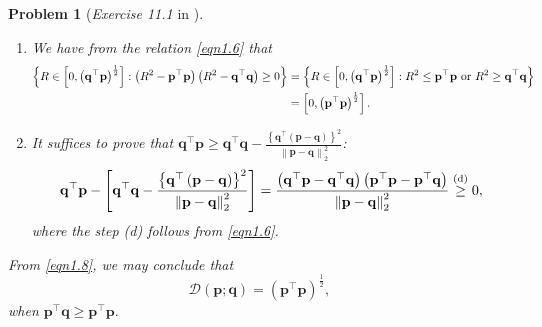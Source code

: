 \documentclass[11pt]{article}
\newtheorem{problem}{Problem}
\numberwithin{equation}{problem}
\begin{document}
\begin{problem} [\emph{Exercise 11.1} in \cite{calafiore2014optimization}]
{\begin{enumerate} [label=(\alph*)]
\begin{equation}
\begin{split}
\begin{cases}
                4 \left[ \left( R^2 - \mathbf{q}^{\top} \mathbf{p} \right)^2 - \left( R^2 - \mathbf{p}^{\top} \mathbf{p} \right) \left( R^2 - \mathbf{q}^{\top} \mathbf{q} \right) \right] & \textnormal{otherwise.}
            \end{cases}
        \end{split}
    \end{equation}
    \item We have from the relation \eqref{eqn1.6} that
    \begin{equation*}
        \begin{split}
            \left\{ R \in \left[ 0, \left( \mathbf{q}^{\top} \mathbf{p} \right)^{\frac{1}{2}} \right] : \left( R^2 - \mathbf{p}^{\top} \mathbf{p} \right) \left( R^2 - \mathbf{q}^{\top} \mathbf{q} \right) \geq 0 \right\} 
            &= \left\{ R \in \left[ 0, \left( \mathbf{q}^{\top} \mathbf{p} \right)^{\frac{1}{2}} \right] : R^2 \leq \mathbf{p}^{\top} \mathbf{p} \textnormal{ or } R^2 \geq \mathbf{q}^{\top} \mathbf{q} \right\} \\
            &= \left[ 0, \left( \mathbf{p}^{\top} \mathbf{p} \right)^{\frac{1}{2}} \right].
        \end{split}
    \end{equation*}
    \item It suffices to prove that $\mathbf{q}^{\top} \mathbf{p} \geq \mathbf{q}^{\top} \mathbf{q}
    - \frac{\left\{ \mathbf{q}^{\top} \left( \mathbf{p} - \mathbf{q} \right) \right\}^2}{\left\| \mathbf{p} - \mathbf{q} \right\|_{2}^2}$:
    \begin{equation*}
        \begin{split}
            \mathbf{q}^{\top} \mathbf{p} - \left[ \mathbf{q}^{\top} \mathbf{q}
            - \frac{\left\{ \mathbf{q}^{\top} \left( \mathbf{p} - \mathbf{q} \right) \right\}^2}{\left\| \mathbf{p} - \mathbf{q} \right\|_{2}^2} \right]
            =
            \frac{\left( \mathbf{q}^{\top} \mathbf{p} - \mathbf{q}^{\top} \mathbf{q} \right) \left( \mathbf{p}^{\top} \mathbf{p} - \mathbf{p}^{\top} \mathbf{q} \right)}{\left\| \mathbf{p} - \mathbf{q} \right\|_{2}^2}
            \stackrel{\textnormal{(d)}}{\geq} 0,
        \end{split}
    \end{equation*}
    where the step (d) follows from \eqref{eqn1.6}.
\end{enumerate}
\noindent From \eqref{eqn1.8}, we may conclude that
\begin{equation}
    \label{eqn1.10}
    \mathcal{D} \left( \mathbf{p}; \mathbf{q} \right) = \left( \mathbf{p}^{\top} \mathbf{p} \right)^{\frac{1}{2}},
\end{equation}
when $\mathbf{p}^{\top} \mathbf{q} \geq \mathbf{p}^{\top} \mathbf{p}$.
\medskip

}
\end{problem}
\end{document}

